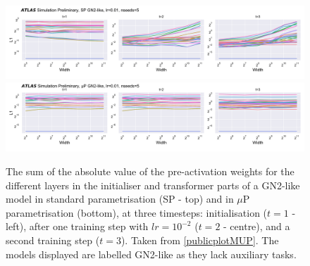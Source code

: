 \begin{figure}[h!]
  \centering
  \includegraphics[width=\textwidth]{Images/FTAG/GN/HPO/spweights.png}\\
  \includegraphics[width=\textwidth]{Images/FTAG/GN/HPO/mupweights.png}
  \caption{The sum of the absolute value of the pre-activation weights for the different layers in the initialiser and transformer parts of a GN2-like model in standard parametrisation (SP - top) and in $\mu$P parametrisation (bottom), at three timesteps: initialisation ($t=1$ - left), after one training step with $lr = 10^{-2}$ ($t=2$ - centre), and a second training step ($t=3$). Taken from \ref{publicplotMUP}. The models displayed are labelled GN2-like as they lack auxiliary tasks. }
  \label{fig:muspweights}
\end{figure} 


